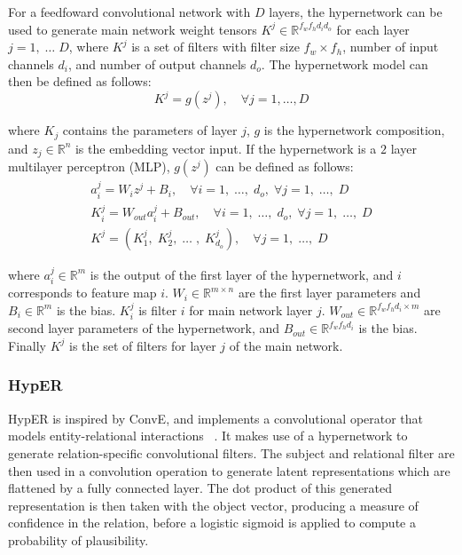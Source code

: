 \noindent For a feedfoward convolutional network with $ D $ layers, the hypernetwork can be used to generate main network weight tensors $ K^j \in \mathbb{R}^{f_wf_hd_id_o} $ for each layer $ j = 1, \; \dots \; D $, where $ K^j $ is a set of filters with filter size $ f_w \times f_h $, number of input channels $ d_i $, and number of output channels $ d_o $. The hypernetwork model can then be defined as follows: 
\begin{equation}
	K^j = g(z^j), \quad \forall j = 1, \dots, D
\end{equation}

\noindent where $ K_j $ contains the parameters of layer $ j $, $ g $ is the hypernetwork composition, and $ z_j \in \mathbb{R}^n $ is the embedding vector input. If the hypernetwork is a $ 2 $ layer multilayer perceptron (MLP), $ g(z^j) $ can be defined as follows:  
\begin{subequations}
	\begin{gather}
		a_i^j = W_iz^j + B_i, \quad \forall i = 1, \; \dots, \; d_o, \; \forall j = 1, \; \dots, \; D \\
		K_i^j = W_{out}a_i^j + B_{out}, \quad \forall i = 1, \; \dots, \; d_o, \; \forall j = 1, \; \dots, \; D \\
		K^j = (K_1^j, \; K_2^j, \; \dots \;, \; K_{d_o}^j), \quad \forall j = 1, \; \dots, \; D
	\end{gather}
\end{subequations}

\noindent where $ a_i^j \in \mathbb{R}^{m} $ is the output of the first layer of the hypernetwork, and $ i $ corresponds to feature map $ i $. $ W_i \in \mathbb{R}^{m \times n} $ are the first layer parameters and $ B_i \in \mathbb{R}^m $ is the bias. $ K_i^j $ is filter $ i $ for main network layer $ j $. $ W_{out} \in \mathbb{R}^{f_w f_hd_i \times m} $ are second layer parameters of the hypernetwork, and $ B_{out} \in \mathbb{R}^{f_wf_hd_i} $ is the bias. Finally $ K^j $ is the set of filters for layer $ j $ of the main network. \par

\subsubsection{HypER}

\noindent HypER is inspired by ConvE, and implements a convolutional operator that models entity-relational interactions \unskip ~\citep{balazevic2019hypernetwork}. It makes use of a hypernetwork to generate relation-specific convolutional filters. The subject and relational filter are then used in a convolution operation to generate latent representations which are flattened by a fully connected layer. The dot product of this generated representation is then taken with the object vector, producing a measure of confidence in the relation, before a logistic sigmoid is applied to compute a probability of plausibility. \par

